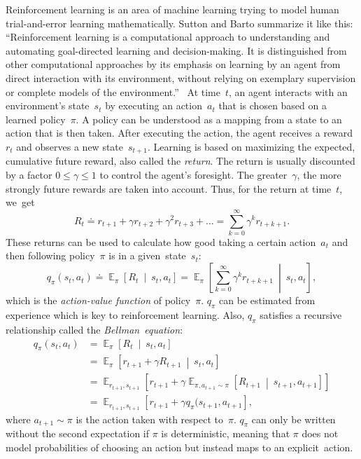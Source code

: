 \documentclass[a4paper,titlepage]{article}
\DeclareMathOperator{\Expectation}{\mathbb{E}}
\newcommand{\Exp}[3]{\Expectation_{#1} \left[ #2 \ \middle| \ #3 \right]}
\newcommand{\Ex}[2]{\Expectation_{#1} \left[ #2 \right]}
\begin{document}
Reinforcement learning is an area of machine learning trying to model human trial-and-error learning mathematically. Sutton and Barto summarize it like this: ``Reinforcement learning is a computational approach to understanding and automating goal-directed learning and decision-making. It is distinguished from other computational approaches by its emphasis on learning by an agent from direct interaction with its environment, without relying on exemplary supervision or complete models of the environment.''~\cite[p.~15]{book} At time~$t$, an agent interacts with an environment's state~$s_t$ by executing an action~$a_t$ that is chosen based on a learned policy~$\pi$. A policy can be understood as a mapping from a state to an action that is then taken. After executing the action, the agent receives a reward~$r_t$ and observes a new state~$s_{t+1}$. Learning is based on maximizing the expected, cumulative future reward, also called the \emph{return}. The return is usually discounted by a factor $0 \leq \gamma \leq 1$ to control the agent's foresight. The greater~$\gamma$, the more strongly future rewards are taken into account. Thus, for the return at time~$t$, we~get
\begin{equation*}
  R_t \doteq r_{t+1} + \gamma r_{t+2} + \gamma^2 r_{t+3} + ... = \sum_{k = 0}^{\infty} \gamma^k r_{t+k+1}.
\end{equation*}
These returns can be used to calculate how good taking a certain action~$a_t$ and then following policy~$\pi$ is in a given~state~$s_t$:
\begin{equation*}
  q_\pi(s_t, a_t) \doteq \Exp{\pi}{R_t}{s_t, a_t} = \Exp{\pi}{\sum_{k = 0}^{\infty} \gamma^k r_{t+k+1}}{s_t, a_t},
\end{equation*}
which is the \emph{action-value function} of policy~$\pi$.
$q_\pi$ can be estimated from experience which is key to reinforcement learning.
Also, $q_\pi$ satisfies a recursive relationship called the \emph{Bellman~equation}:
\begin{align*}
  q_\pi(s_t, a_t) &= \Exp{\pi}{R_t}{s_t, a_t} \\
  &= \Exp{\pi}{r_{t+1} + \gamma R_{t + 1}}{s_t, a_t} \\
  &= \Ex{r_{t+1}, s_{t+1}}{r_{t+1} + \gamma \Exp{\pi, a_{t+1} \sim \pi}{R_{t+1}}{s_{t+1}, a_{t+1}}} \\
  &= \Ex{r_{t+1}, s_{t+1}}{r_{t+1} + \gamma q_\pi(s_{t+1}, a_{t+1}},
\end{align*}
where $a_{t+1} \sim \pi$ is the action taken with respect to~$\pi$.
$q_\pi$ can only be written without the second expectation if $\pi$ is deterministic, meaning that $\pi$ does not model probabilities of choosing an action but instead maps to an explicit~action.
\end{document}
